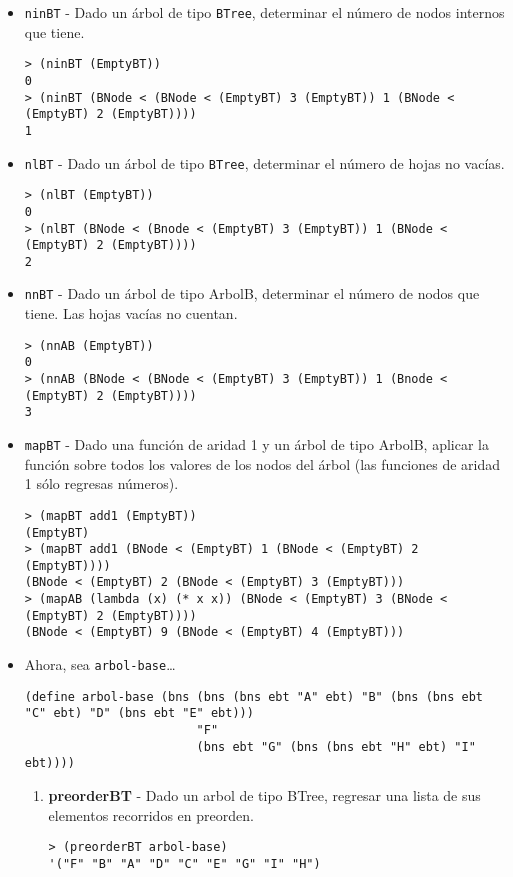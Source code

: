 \documentclass{article}
\begin{document}
\newpage
\begin{itemize}
\item \texttt{ninBT} - Dado un árbol de tipo \verb;BTree;, determinar el número de nodos internos que tiene.
\begin{verbatim}
> (ninBT (EmptyBT))
0
> (ninBT (BNode < (BNode < (EmptyBT) 3 (EmptyBT)) 1 (BNode < (EmptyBT) 2 (EmptyBT))))
1
\end{verbatim}

\item \texttt{nlBT} - Dado un árbol de tipo \verb;BTree;, determinar el número de hojas no vacías.
\begin{verbatim}
> (nlBT (EmptyBT))
0
> (nlBT (BNode < (Bnode < (EmptyBT) 3 (EmptyBT)) 1 (BNode < (EmptyBT) 2 (EmptyBT))))
2
\end{verbatim}

\item \texttt{nnBT} - Dado un árbol de tipo ArbolB, determinar el número de nodos que tiene. Las hojas vacías no cuentan.
\begin{verbatim}
> (nnAB (EmptyBT))
0
> (nnAB (BNode < (BNode < (EmptyBT) 3 (EmptyBT)) 1 (Bnode < (EmptyBT) 2 (EmptyBT))))
3
\end{verbatim}

\item \texttt{mapBT} - Dado una función de aridad 1 y un árbol de tipo ArbolB, aplicar la función sobre todos los valores de los nodos del árbol (las funciones de aridad 1 sólo regresas números).
\begin{verbatim}
> (mapBT add1 (EmptyBT))
(EmptyBT)
> (mapBT add1 (BNode < (EmptyBT) 1 (BNode < (EmptyBT) 2 (EmptyBT))))
(BNode < (EmptyBT) 2 (BNode < (EmptyBT) 3 (EmptyBT)))
> (mapAB (lambda (x) (* x x)) (BNode < (EmptyBT) 3 (BNode < (EmptyBT) 2 (EmptyBT))))
(BNode < (EmptyBT) 9 (BNode < (EmptyBT) 4 (EmptyBT)))
\end{verbatim}

\newpage
\item Ahora, sea \verb;arbol-base;\dots
\begin{verbatim}
(define arbol-base (bns (bns (bns ebt "A" ebt) "B" (bns (bns ebt "C" ebt) "D" (bns ebt "E" ebt))) 
                        "F"
                        (bns ebt "G" (bns (bns ebt "H" ebt) "I" ebt))))
\end{verbatim}

\begin{enumerate}
\item  \textbf{preorderBT} - Dado un arbol de tipo BTree, regresar una lista de sus elementos recorridos en preorden.
\begin{verbatim}
> (preorderBT arbol-base)
'("F" "B" "A" "D" "C" "E" "G" "I" "H")
\end{verbatim}


\end{enumerate}
\end{itemize}
\end{document}
